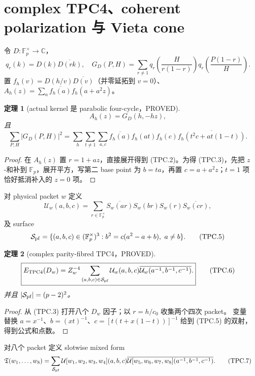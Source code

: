 \documentclass[11pt,a4paper]{ctexart}
\newtheorem{theorem}{定理}[section]
\theoremstyle{definition}
\newcommand{\1}{\mathbf 1}
\newcommand{\F}{\mathbb F}
\newcommand{\G}{\F_p^\times}
\newcommand{\C}{\mathbb C}
\newcommand{\PROVED}{\textcolor{green!40!black}{\textsf{PROVED}}}
\begin{document}
\section{complex TPC4、coherent polarization 与 Vieta cone}
\label{sec:tpc4}

令 $D:\G\to\C$，
\[
 q_r(k)=D(k)\overline{D(rk)},\quad
 G_D(P,H)=\sum_{r\ne1}q_r\!\left(\frac{H}{r(1-r)}\right)
 q_r\!\left(\frac{P(1-r)}H\right).                  \tag{TPC.1}
\]
置 $f_h(v)=D(h/v)\overline{D(v)}$（并零延拓到 $v=0$）、
$A_h(z)=\sum_a\overline{f_h(a)}f_h(a+a^2z)$。

\begin{theorem}[actual kernel 是 parabolic four-cycle，\PROVED]
\[
 \boxed{A_h(z)=G_D(h,-hz)},                           \tag{TPC.2}
\]
且
\[
 \sum_{P,H}|G_D(P,H)|^2
 =\sum_{h}\sum_{t\ne1}\sum_{a,c}
 \overline{f_h(a)}f_h(at)f_h(c)
 \overline{f_h(t^2c+at(1-t))}.                       \tag{TPC.3}
\]
\end{theorem}
\begin{proof}
在 $A_h(z)$ 置 $r=1+az$，直接展开得到 (TPC.2)。为得 (TPC.3)，先把
$z$-和补到 $\F_p$，展开平方，写第二 base point 为 $b=ta$，再置
$c=a+a^2z$；$t=1$ 项恰好抵消补入的 $z=0$ 项。
\end{proof}

对 physical packet $w$ 定义
\[
 \mathcal U_w(a,b,c)=\sum_{r\in\G}
 \overline{S_w(ar)}S_w(br)S_w(r)\overline{S_w(cr)},  \tag{TPC.4}
\]
及 surface
\[
 \mathcal S_{\rm pf}=\{(a,b,c)\in(\G)^3:b^2=c(a^2-a+b),\ a\ne b\}.
                                                               \tag{TPC.5}
\]

\begin{theorem}[complex parity-fibred TPC4，\PROVED]
\[
 \boxed{E_{\rm TPC4}(D_w)=Z_w^{-4}
 \sum_{(a,b,c)\in\mathcal S_{\rm pf}}
 \mathcal U_w(a,b,c)\overline{\mathcal U_w(a^{-1},b^{-1},c^{-1})}.}
                                                               \tag{TPC.6}
\]
并且 $|\mathcal S_{\rm pf}|=(p-2)^2$。
\end{theorem}
\begin{proof}
从 (TPC.3) 打开八个 $D_w$ 因子；以 $r=h/c_0$ 收集两个四次 packet。
变量替换
$a=x^{-1}$、$b=(xt)^{-1}$、$c=[t(t+x(1-t))]^{-1}$
给到 (TPC.5) 的双射，得到公式和点数。
\end{proof}

对八个 packet 定义 slotwise mixed form
\[
 \mathfrak T(w_1,\ldots,w_8)=\sum_{\mathcal S_{\rm pf}}
 \mathcal U[w_1,w_2,w_3,w_4](a,b,c)
 \overline{\mathcal U[w_5,w_6,w_7,w_8](a^{-1},b^{-1},c^{-1})}.
                                                               \tag{TPC.7}
\]
\end{document}
